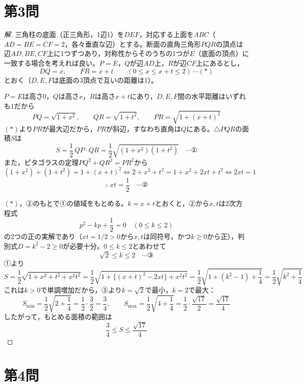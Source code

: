 \documentclass[../main.tex]{subfiles}
\begin{document}
\newpage

\section*{第3問}

\begin{proof}[解]
  三角柱の底面（正三角形，1辺1）を$DEF$，対応する上面を$ABC$（$AD=BE=CF=2$，各々垂直な辺）とする。断面の直角三角形$PQR$の頂点は辺$AD,BE,CF$上に1つずつあり，対称性からそのうちの1つが$E$（底面の頂点）に一致する場合を考えれば良い。$P=E$，$Q$が辺$AD$上，$R$が辺$CF$上にあるとし，
  \[
    DQ=x,\qquad FR=x+t \qquad(0\le x\le x+t\le2)\ \cdots(\ast)
  \]
  とおく（$D,E,F$は底面の3頂点で互いの距離は1）。

  $P=E$は高さ$0$，$Q$は高さ$x$，$R$は高さ$x+t$にあり，$D,E,F$間の水平距離はいずれも$1$だから
  \[
    PQ=\sqrt{1+x^2},\qquad QR=\sqrt{1+t^2},\qquad PR=\sqrt{1+(x+t)^2}
  \]
  $(\ast)$より$PR$が最大辺だから，$PR$が斜辺，すなわち直角は$Q$にある。$\triangle PQR$の面積$S$は
  \[
    S=\frac12\,QP\cdot QR=\frac12\sqrt{(1+x^2)(1+t^2)} \quad\cdots\text{①}
  \]
  また，ピタゴラスの定理$PQ^2+QR^2=PR^2$から
  \[
    (1+x^2)+(1+t^2)=1+(x+t)^2 \iff 2+x^2+t^2=1+x^2+2xt+t^2 \iff 2xt=1
  \]
  \[
    \therefore\ xt=\frac12 \quad\cdots\text{②}
  \]

  $(\ast)$，②のもとで①の値域をもとめる。$k=x+t$とおくと，②から$x,t$は2次方程式
  \[
    p^2-kp+\frac12=0 \quad(0\le k\le2)
  \]
  の2つの正の実解であり（$xt=1/2>0$から$x,t$は同符号，かつ$k\ge0$から正），判別式$D=k^2-2\ge0$が必要十分。$0\le k\le2$とあわせて
  \[
    \sqrt2\le k\le2 \quad\cdots\text{③}
  \]
  ①より
  \[
    S=\frac12\sqrt{1+x^2+t^2+x^2t^2}=\frac12\sqrt{1+\{(x+t)^2-2xt\}+x^2t^2}=\frac12\sqrt{1+(k^2-1)+\frac14}=\frac12\sqrt{k^2+\frac14}
  \]
  これは$k>0$で単調増加だから，③より$k=\sqrt2$で最小，$k=2$で最大：
  \[
    S_{\min}=\frac12\sqrt{2+\frac14}=\frac12\cdot\frac32=\frac34,\qquad
    S_{\max}=\frac12\sqrt{4+\frac14}=\frac12\cdot\frac{\sqrt{17}}2=\frac{\sqrt{17}}4
  \]
  したがって，もとめる面積の範囲は
  \[
    \frac34\le S\le\frac{\sqrt{17}}4
  \]
\end{proof}

\newpage

\section*{第4問}
\end{document}
